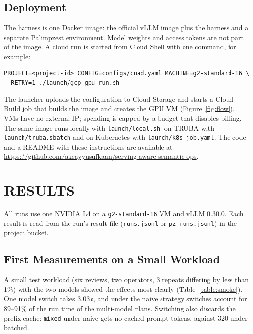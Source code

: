 \documentclass[a4paper,12pt]{report}
\newcommand{\code}[1]{\texttt{#1}}
\begin{document}
\section{Deployment}

The harness is one Docker image: the official vLLM image plus the harness and a separate Palimpzest
environment. Model weights and access tokens are not part of the image. A cloud run is started from
Cloud Shell with one command, for example:

\begin{verbatim}
PROJECT=<project-id> CONFIG=configs/cuad.yaml MACHINE=g2-standard-16 \
  RETRY=1 ./launch/gcp_gpu_run.sh
\end{verbatim}

The launcher uploads the configuration to Cloud Storage and starts a Cloud Build job that builds the
image and creates the GPU VM (Figure~\ref{fig:flow}). VMs have no external IP; spending is capped by
a budget that disables billing. The same image runs locally with \code{launch/local.sh}, on TRUBA with
\code{launch/truba.sbatch} and on Kubernetes with \code{launch/k8s\_job.yaml}. The code and a README
with these instructions are available at
\url{https://github.com/akcayyusufkaan/serving-aware-semantic-ops}.

\chapter{RESULTS}

All runs use one NVIDIA L4 on a \code{g2-standard-16} VM and vLLM 0.30.0. Each result is read from
the run's result file (\code{runs.jsonl} or \code{pz\_runs.jsonl}) in the project bucket.

\section{First Measurements on a Small Workload}

A small test workload (six reviews, two operators, 3 repeats differing by less than 1\%) with the two
models showed the effects most clearly (Table~\ref{table:smoke}). One model switch takes 3.03\,s, and
under the naive strategy switches account for 89--91\% of the run time of the multi-model plans.
Switching also discards the prefix cache: \code{mixed} under naive gets no cached prompt tokens,
against 320 under batched.
\end{document}
